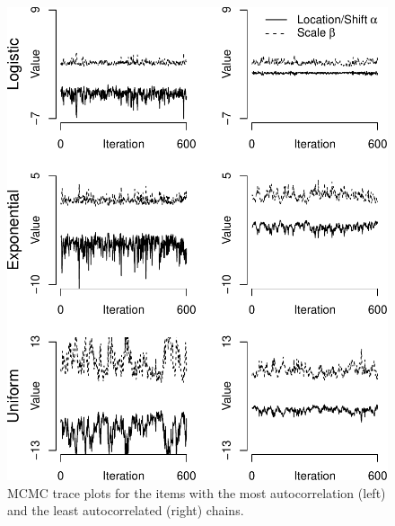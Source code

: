 \documentclass[english,,man]{apa6}
\begin{document}
\begin{figure}
\centering
\includegraphics{p_files/figure-latex/LSAT6Chains-1.pdf}
\caption{\label{fig:LSAT6Chains}MCMC trace plots for the items with the most autocorrelation (left) and the least autocorrelated (right) chains.}
\end{figure}
\end{document}
